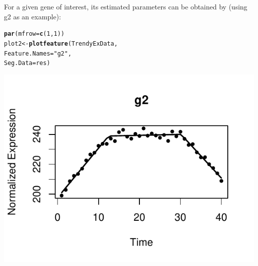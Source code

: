 \documentclass{article}\usepackage[]{graphicx}\usepackage[usenames,dvipsnames]{color}
\makeatletter
\def\maxwidth{ %
  \ifdim\Gin@nat@width>\linewidth
    \linewidth
  \else
    \Gin@nat@width
  \fi
}
\newcommand{\hlnum}[1]{\textcolor[rgb]{0.686,0.059,0.569}{#1}}%
\newcommand{\hlstr}[1]{\textcolor[rgb]{0.192,0.494,0.8}{#1}}%
\newcommand{\hlstd}[1]{\textcolor[rgb]{0.345,0.345,0.345}{#1}}%
\newcommand{\hlkwb}[1]{\textcolor[rgb]{0.69,0.353,0.396}{#1}}%
\newcommand{\hlkwc}[1]{\textcolor[rgb]{0.333,0.667,0.333}{#1}}%
\newcommand{\hlkwd}[1]{\textcolor[rgb]{0.737,0.353,0.396}{\textbf{#1}}}%
\newenvironment{kframe}{%
 \def\at@end@of@kframe{}%
 \ifinner\ifhmode%
  \def\at@end@of@kframe{\end{minipage}}%
  \begin{minipage}{\columnwidth}%
 \fi\fi%
 \def\FrameCommand##1{\hskip\@totalleftmargin \hskip-\fboxsep
 \colorbox{shadecolor}{##1}\hskip-\fboxsep
     \hskip-\linewidth \hskip-\@totalleftmargin \hskip\columnwidth}%
 \MakeFramed {\advance\hsize-\width
   \@totalleftmargin\z@ \linewidth\hsize
   \@setminipage}}%
 {\par\unskip\endMakeFramed%
 \at@end@of@kframe}
\newenvironment{knitrout}{}{} %
\makeatother
\begin{document}
For a given gene of interest, its estimated parameters can be obtained by (using g2 as an example):
\begin{knitrout}
\color{fgcolor}\begin{kframe}
\begin{alltt}
\hlkwd{par}\hlstd{(}\hlkwc{mfrow}\hlstd{=}\hlkwd{c}\hlstd{(}\hlnum{1}\hlstd{,}\hlnum{1}\hlstd{))}
\hlstd{plot2} \hlkwb{<-} \hlkwd{plotfeature}\hlstd{(TrendyExData,}
                    \hlkwc{Feature.Names} \hlstd{=} \hlstr{"g2"}\hlstd{,}
                    \hlkwc{Seg.Data} \hlstd{= res)}
\end{alltt}
\end{kframe}

{\centering \includegraphics[width=\maxwidth]{figure/unnamed-chunk-13-1} 

}



\end{knitrout}
\end{document}
